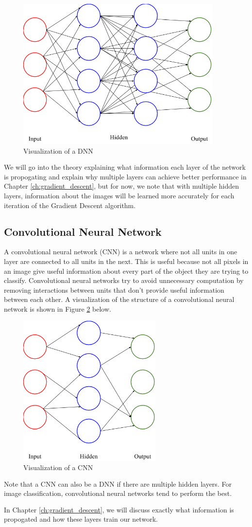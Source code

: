 \begin{figure}[ht!]
\centering
\includegraphics[height=3in]{../figures/deep_nn.png}
\caption{Visualization of a DNN}
\label{fig:dnn}
\end{figure}

We will go into the theory explaining what information each layer of the
network is propogating and explain why multiple layers can achieve better
performance in Chapter \ref{ch:gradient_descent}, but for now, we note that
with multiple hidden layers, information about the images will be learned more
accurately for each iteration of the Gradient Descent algorithm.

\subsection{Convolutional Neural Network}
A convolutional neural network (CNN) is a network where not all units in one
layer are connected to all units in the next. This is useful because not all
pixels in an image give useful information about every part of the object they
are trying to classify. Convolutional neural networks try to avoid unnecessary
computation by removing interactions between units that don't provide useful
information between each other. A visualization of the structure of a
convolutional neural network is shown in Figure \ref{fig:cnn} below.
\newpage
\begin{figure}[ht!]
\centering
\includegraphics[height=3in]{../figures/convolutional_nn.png}
\caption{Visualization of a CNN}
\label{fig:cnn}
\end{figure}

Note that a CNN can also be a DNN if there are multiple hidden layers. For
image classification, convolutional neural networks tend to perform the best.

\noindent In Chapter \ref{ch:gradient_descent}, we will discuss exactly what
information is propogated and how these layers train our network.
